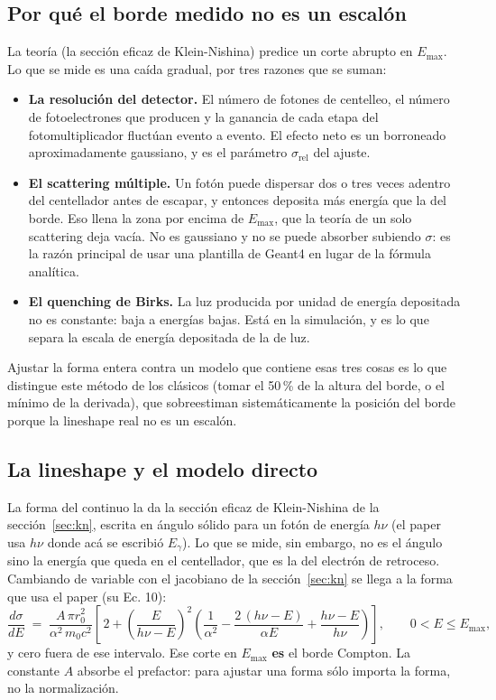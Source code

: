 \documentclass[11pt,a4paper]{article}
\begin{document}
\subsection{Por qué el borde medido no es un escalón}

La teoría (la sección eficaz de Klein-Nishina) predice un corte abrupto en
$E_{\max}$. Lo que se mide es una caída gradual, por tres razones que se suman:

\begin{itemize}
\item \textbf{La resolución del detector.} El número de fotones de centelleo,
      el número de fotoelectrones que producen y la ganancia de cada etapa del
      fotomultiplicador fluctúan evento a evento. El efecto neto es un
      borroneado aproximadamente gaussiano, y es el parámetro
      $\sigma_{\text{rel}}$ del ajuste.
\item \textbf{El scattering múltiple.} Un fotón puede dispersar dos o tres
      veces adentro del centellador antes de escapar, y entonces deposita más
      energía que la del borde. Eso llena la zona por encima de $E_{\max}$, que
      la teoría de un solo scattering deja vacía. No es gaussiano y no se puede
      absorber subiendo $\sigma$: es la razón principal de usar una plantilla
      de Geant4 en lugar de la fórmula analítica.
\item \textbf{El quenching de Birks.} La luz producida por unidad de energía
      depositada no es constante: baja a energías bajas. Está en la simulación,
      y es lo que separa la escala de energía depositada de la de luz.
\end{itemize}

Ajustar la forma entera contra un modelo que contiene esas tres cosas es lo que
distingue este método de los clásicos (tomar el 50\,\% de la altura del borde,
o el mínimo de la derivada), que sobreestiman sistemáticamente la posición del
borde porque la lineshape real no es un escalón.

\subsection{La lineshape y el modelo directo}
\label{sec:lineshape}

La forma del continuo la da la sección eficaz de Klein-Nishina de la
sección~\ref{sec:kn}, escrita en ángulo sólido para un fotón de energía
$h\nu$ (el paper usa $h\nu$ donde acá se escribió $E_\gamma$).
Lo que se mide, sin embargo, no es el ángulo sino la energía que queda en el
centellador, que es la del electrón de retroceso. Cambiando de variable con el
jacobiano de la sección~\ref{sec:kn} se llega a la forma que usa el paper (su
Ec. 10):
\[
   \frac{d\sigma}{dE} \;=\; \frac{A\,\pi r_0^2}{\alpha^2\, m_0c^2}
   \left[\,2 + \left(\frac{E}{h\nu - E}\right)^{\!2}
   \left(\frac{1}{\alpha^2} - \frac{2\,(h\nu-E)}{\alpha E}
         + \frac{h\nu-E}{h\nu}\right)\right],
   \qquad 0 < E \le E_{\max},
\]
y cero fuera de ese intervalo. Ese corte en $E_{\max}$ \textbf{es} el borde
Compton. La constante $A$ absorbe el prefactor: para ajustar una forma sólo
importa la forma, no la normalización.
\end{document}
